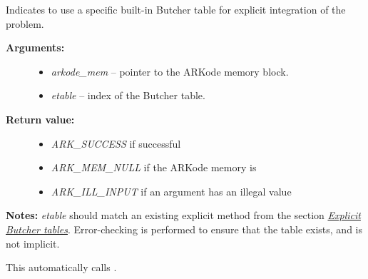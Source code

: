 \documentclass[letterpaper,10pt,english]{sphinxmanual}
\begin{document}
\begin{fulllineitems}
\label{c_interface/User_callable:ARKodeSetERKTableNum}
Indicates to use a specific built-in Butcher table for explicit
integration of the problem.
\begin{description}
\item[{\textbf{Arguments:}}] \leavevmode\begin{itemize}
\item {} 
\emph{arkode\_mem} -- pointer to the ARKode memory block.

\item {} 
\emph{etable} -- index of the Butcher table.

\end{itemize}

\item[{\textbf{Return value:}}] \leavevmode\begin{itemize}
\item {} 
\emph{ARK\_SUCCESS} if successful

\item {} 
\emph{ARK\_MEM\_NULL} if the ARKode memory is 

\item {} 
\emph{ARK\_ILL\_INPUT} if an argument has an illegal value

\end{itemize}

\end{description}

\textbf{Notes:} \emph{etable} should match an existing explicit method from
the section {\hyperref[Butcher:butcher-explicit]{\emph{Explicit Butcher tables}}}.  Error-checking is performed
to ensure that the table exists, and is not implicit.

This automatically calls {\hyperref[c_interface/User_callable:ARKodeSetExplicit]{}}.

\end{fulllineitems}

\end{document}
